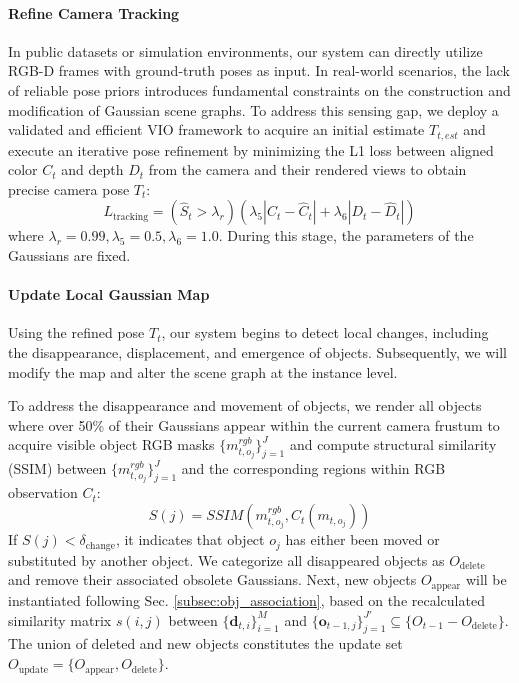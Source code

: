\paragraph{Refine Camera Tracking}
\label{para:camera_tracking}
In public datasets or simulation environments, our system can directly utilize RGB-D frames with ground-truth poses as input. In real-world scenarios, the lack of reliable pose priors introduces fundamental constraints on the construction and modification of Gaussian scene graphs. To address this sensing gap, we deploy a validated and efficient VIO\cite{qin2017vins} framework to acquire an initial estimate $T_{t,est}$ and execute an iterative pose refinement by minimizing the L1 loss between aligned color $C_{t}$ and depth $D_{t}$ from the camera and their rendered views to obtain precise camera pose $T_{t}$:
\begin{equation}
    L_\text{tracking} = (\hat{S}_t > \lambda_r)(\lambda_5|C_t - \hat{C}_t| + \lambda_6|D_t - \hat{D}_t|)
\end{equation}
where $\lambda_r = 0.99, \lambda_5 = 0.5, \lambda_6 = 1.0$. During this stage, the parameters of the Gaussians are fixed.

\paragraph{Update Local Gaussian Map}
\label{para:update_map}
Using the refined pose $T_{t}$, our system begins to detect local changes, including the disappearance, displacement, and emergence of objects. Subsequently, we will modify the map and alter the scene graph at the instance level.

To address the disappearance and movement of objects, we render all objects where over 50\% of their Gaussians appear within the current camera frustum to acquire visible object RGB masks $\{m_{t, o_j}^{rgb}\}_{j=1}^{J}$ and compute structural similarity (SSIM) between $\{m_{t, o_j}^{rgb}\}_{j=1}^{J}$ and the corresponding regions within RGB observation $C_t$:
\begin{equation}
S(j) = SSIM(m_{t, o_j}^{rgb}, C_t(m_{t, o_j}))
\end{equation}
If $ S(j) < \delta_{\text{change}} $, it indicates that object $o_j$ has either been moved or substituted by another object. We categorize all disappeared objects as $O_\text{delete}$ and remove their associated obsolete Gaussians. Next, new objects $O_\text{appear}$ will be instantiated following Sec. \ref{subsec:obj_association}, based on the recalculated similarity matrix $s(i, j)$ between $\{\textbf{d}_{t,i}\}_{i=1}^{M}$ and $\{\textbf{o}_{t-1,j}\}_{j=1}^{J'} \subseteq \{O_{t-1} - O_\text{delete}\}$. The union of deleted and new objects constitutes the update set $O_\text{update} = \{O_\text{appear}, O_\text{delete}\}$.

